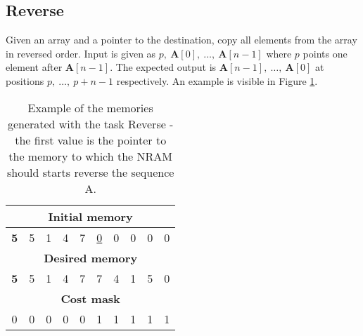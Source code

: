 \subsection{Reverse}
Given an array and a pointer to the destination, copy all elements from the array in reversed order. Input is given as $p,\ \textbf{A}[0],\ \dots,\ \textbf{A}[n-1]$ where $p$ points one element after $\textbf{A}[n-1]$. The expected output is $\textbf{A}[n-1],\ \dots,\ \textbf{A}[0]$ at positions $p,\ \dots,\ p+n-1$ respectively. An example is visible in Figure \ref{fig:reverse-example}.
\begin{table}[h!]
	\centering
	\begin{tabular}{|c|c|c|c|c|c|c|c|c|c|}
		\hline
		\multicolumn{10}{|c|}{\textbf{Initial memory}} \\ \hline
		\textbf{5} & 5 & 1 & 4 & 7 & \underline{0} & 0 & 0 & 0 & 0 \\ \hline\hline\hline
		\multicolumn{10}{|c|}{\textbf{Desired memory}} \\ \hline
		\textbf{5} & 5 & 1 & 4 & 7 & 7 & 4 & 1 & 5 & 0 \\ \hline\hline\hline
		\multicolumn{10}{|c|}{\textbf{Cost mask}} \\ \hline
		0 & 0 & 0 & 0 & 0 & 1 & 1 & 1 & 1 & 1 \\ \hline
	\end{tabular}
	\caption{Example of the memories generated with the task Reverse - the first value is the pointer to the memory to which the NRAM should starts reverse the sequence A.}
	\label{fig:reverse-example}
\end{table}
\FloatBarrier

